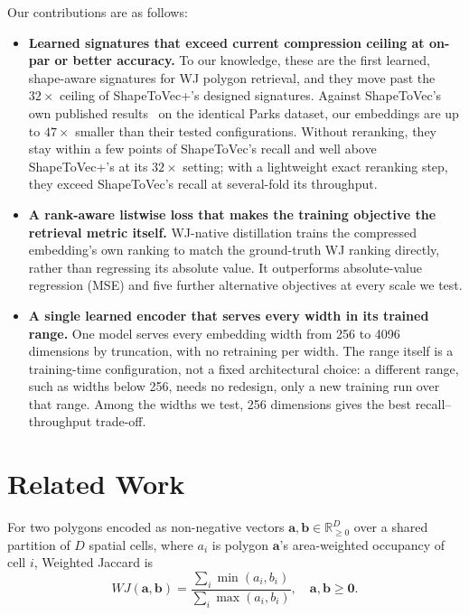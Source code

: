 \documentclass[conference]{IEEEtran}
\newcommand{\rs}[1]{\textcolor{green!55!black}{[RS: #1]}}
\newcommand{\ba}[1]{\textcolor{orange}{[BA: #1]}}
\begin{document}
Our contributions are as follows:
\begin{itemize}
  \item 
    \textbf{Learned signatures that exceed current compression ceiling at
    on-par or better accuracy.} To our knowledge, these are the first learned,
    shape-aware signatures for WJ polygon retrieval, and they move past the
    $32\times$ ceiling of ShapeToVec+'s designed signatures. Against ShapeToVec's own
    published results~\cite{shape2vec} on the identical Parks dataset, our embeddings
    are up to $47\times$ smaller than their tested configurations. Without
    reranking, they stay within a few points of
    ShapeToVec's recall and well above ShapeToVec+'s at its $32\times$ setting; with a
    lightweight exact reranking step, they exceed ShapeToVec's recall at several-fold
    its throughput.
  \item 
    \textbf{A rank-aware listwise loss that makes the training objective the retrieval
    metric itself.} WJ-native distillation trains the compressed embedding's own
    ranking to match the ground-truth WJ ranking directly, rather than regressing its
    absolute value. It outperforms absolute-value regression (MSE) and five further
    alternative objectives at every scale we test.
  \item 
    \textbf{A single learned encoder that serves every width in its trained range.}
    One model serves every embedding width from 256 to 4096 dimensions by
    truncation, with no retraining per width. The range itself is a training-time
    configuration, not a fixed
    architectural choice: a different range, such as widths below 256, needs no
    redesign, only a new training run over that range. Among the widths we test, 256
    dimensions gives the best recall--throughput trade-off.
\end{itemize}

\section{Related Work}
\label{sec:related}
For two polygons encoded as non-negative vectors $\mathbf{a},\mathbf{b}\in\mathbb{R}^D_{\ge0}$
over a shared partition of $D$ spatial cells, where $a_i$ is polygon $\mathbf{a}$'s
area-weighted occupancy of cell $i$, Weighted Jaccard is
\begin{equation}
  WJ(\mathbf{a},\mathbf{b}) = \frac{\sum_i \min(a_i,b_i)}{\sum_i \max(a_i,b_i)},
  \quad \mathbf{a},\mathbf{b} \ge \mathbf{0}.
  \label{eq:wj}
\end{equation}
\end{document}
